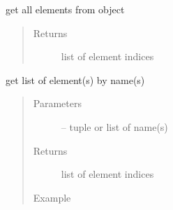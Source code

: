 \documentclass[letterpaper,10pt,english]{sphinxmanual}
\begin{document}
\begin{fulllineitems}

\begin{fulllineitems}
\label{\detokenize{src/apidocs/genopt:genopt.DakotaOC.get_all_elem}}
get all elements from  object
\begin{quote}\begin{description}
\item[{Returns}] \leavevmode
list of element indices

\end{description}\end{quote}

\end{fulllineitems}


\begin{fulllineitems}
\label{\detokenize{src/apidocs/genopt:genopt.DakotaOC.get_elem_by_name}}
get list of element(s) by name(s)
\begin{quote}\begin{description}
\item[{Parameters}] \leavevmode
{} -- tuple or list of name(s)

\item[{Returns}] \leavevmode
list of element indices

\item[{Example}] \leavevmode
\end{description}\end{quote}

\begin{sphinxVerbatim}[commandchars=\\\{\},formatcom=\scriptsize]
  
   
  
\end{sphinxVerbatim}


\end{fulllineitems}
\end{fulllineitems}
\end{document}
